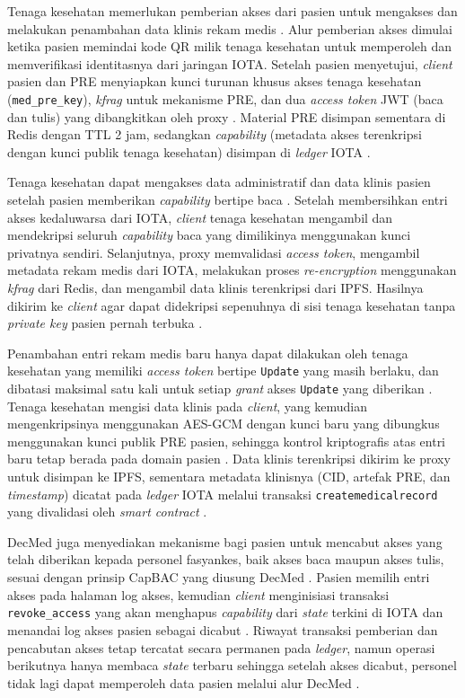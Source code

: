 Tenaga kesehatan memerlukan pemberian akses dari pasien untuk mengakses dan melakukan penambahan data klinis rekam medis \parencite{Purnama_2026}.
Alur pemberian akses dimulai ketika pasien memindai kode QR milik tenaga kesehatan untuk memperoleh dan memverifikasi identitasnya dari jaringan IOTA\@.
Setelah pasien menyetujui, \textit{client} pasien dan PRE menyiapkan kunci turunan khusus akses tenaga kesehatan (\texttt{med\_pre\_key}), \textit{kfrag} untuk mekanisme PRE, dan dua \textit{access token} JWT (baca dan tulis) yang dibangkitkan oleh proxy \parencite{Purnama_2026}.
Material PRE disimpan sementara di Redis dengan TTL 2 jam, sedangkan \textit{capability} (metadata akses terenkripsi dengan kunci publik tenaga kesehatan) disimpan di \textit{ledger} IOTA \parencite{Purnama_2026}.

Tenaga kesehatan dapat mengakses data administratif dan data klinis pasien setelah pasien memberikan \textit{capability} bertipe baca \parencite{Purnama_2026}.
Setelah membersihkan entri akses kedaluwarsa dari IOTA, \textit{client} tenaga kesehatan mengambil dan mendekripsi seluruh \textit{capability} baca yang dimilikinya menggunakan kunci privatnya sendiri.
Selanjutnya, proxy memvalidasi \textit{access token}, mengambil metadata rekam medis dari IOTA, melakukan proses \textit{re-encryption} menggunakan \textit{kfrag} dari Redis, dan mengambil data klinis terenkripsi dari IPFS\@.
Hasilnya dikirim ke \textit{client} agar dapat didekripsi sepenuhnya di sisi tenaga kesehatan tanpa \textit{private key} pasien pernah terbuka \parencite{Purnama_2026}.

Penambahan entri rekam medis baru hanya dapat dilakukan oleh tenaga kesehatan yang memiliki \textit{access token} bertipe \texttt{Update} yang masih berlaku, dan dibatasi maksimal satu kali untuk setiap \textit{grant} akses \texttt{Update} yang diberikan \parencite{Purnama_2026}.
Tenaga kesehatan mengisi data klinis pada \textit{client}, yang kemudian mengenkripsinya menggunakan AES-GCM dengan kunci baru yang dibungkus menggunakan kunci publik PRE pasien, sehingga kontrol kriptografis atas entri baru tetap berada pada domain pasien \parencite{Purnama_2026}.
Data klinis terenkripsi dikirim ke proxy untuk disimpan ke IPFS, sementara metadata klinisnya (CID, artefak PRE, dan \textit{timestamp}) dicatat pada \textit{ledger} IOTA melalui transaksi \texttt{createmedicalrecord} yang divalidasi oleh \textit{smart contract} \parencite{Purnama_2026}.

DecMed juga menyediakan mekanisme bagi pasien untuk mencabut akses yang telah diberikan kepada personel fasyankes, baik akses baca maupun akses tulis, sesuai dengan prinsip CapBAC yang diusung DecMed \parencite{Purnama_2026}.
Pasien memilih entri akses pada halaman log akses, kemudian \textit{client} menginisiasi transaksi \texttt{revoke\_access} yang akan menghapus \textit{capability} dari \textit{state} terkini di IOTA dan menandai log akses pasien sebagai dicabut \parencite{Purnama_2026}.
Riwayat transaksi pemberian dan pencabutan akses tetap tercatat secara permanen pada \textit{ledger}, namun operasi berikutnya hanya membaca \textit{state} terbaru sehingga setelah akses dicabut, personel tidak lagi dapat memperoleh data pasien melalui alur DecMed \parencite{Purnama_2026}.
